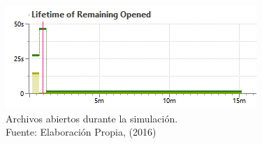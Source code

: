 \begin{figure}[H]
        \centering
        \captionsetup{justification=centering}
        \includegraphics[scale=1.2]{images/FileOpenedClosed.png}
        \caption[Archivos abiertos durante la simulación.]{Archivos abiertos durante la simulación.\\Fuente: Elaboración Propia, (2016)}
        \label{fig:fileOpenClose}
\end{figure}




